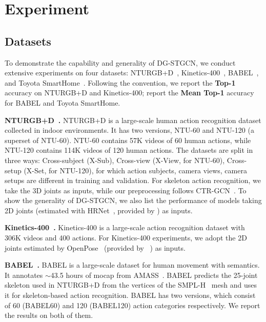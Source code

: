 \section{Experiment}

\subsection{Datasets}

To demonstrate the capability and generality of DG-STGCN, 
we conduct extensive experiments on four datasets: NTURGB+D~\cite{liu2020ntu,shahroudy2016ntu}, Kinetics-400~\cite{carreira2017quo}, 
BABEL~\cite{punnakkal2021babel}, and Toyota SmartHome~\cite{Das_2019_ICCV}. 
Following the convention, we report the \textbf{Top-1} accuracy on NTURGB+D and Kinetics-400; report the \textbf{Mean Top-1} accuracy for BABEL and Toyota SmartHome.

\noindent
\textbf{NTURGB+D~\cite{liu2020ntu,shahroudy2016ntu}. } 
NTURGB+D is a large-scale human action recognition dataset collected in indoor environments. 
It has two versions, NTU-60 and NTU-120 (a superset of NTU-60).
NTU-60 contains 57K videos of 60 human actions, while NTU-120 contains 114K videos of 120 human actions. 
The datasets are split in three ways: Cross-subject (X-Sub), Cross-view (X-View, for NTU-60), Cross-setup (X-Set, for NTU-120), for which action subjects, camera views, camera setups are different in training and validation.
For skeleton action recognition, we take the 3D joints as inputs, while our preprocessing follows CTR-GCN~\cite{chen2021channel}. 
To show the generality of DG-STGCN, we also list the performance of models taking 2D joints (estimated with HRNet~\cite{sun2019deep}, provided by \cite{duan2021revisiting}) as inputs.   

\noindent
\textbf{Kinetics-400~\cite{carreira2017quo}. }
Kinetics-400 is a large-scale action recognition dataset with 306K videos and 400 actions. 
For Kinetics-400 experiments, we adopt the 2D joints estimated by OpenPose~\cite{8765346} (provided by ~\cite{yan2018spatial}) as inputs.

\noindent
\textbf{BABEL~\cite{punnakkal2021babel}. }
BABEL is a large-scale dataset for human movement with semantics. 
It annotates $\sim$43.5 hours of mocap from AMASS~\cite{mahmood2019amass}. 
BABEL predicts the 25-joint skeleton used in NTURGB+D from the vertices of the SMPL-H~\cite{romero2022embodied} mesh and uses it for skeleton-based action recognition.
BABEL has two versions, which consist of 60 (BABEL60) and 120 (BABEL120) action categories respectively. 
We report the results on both of them. 

